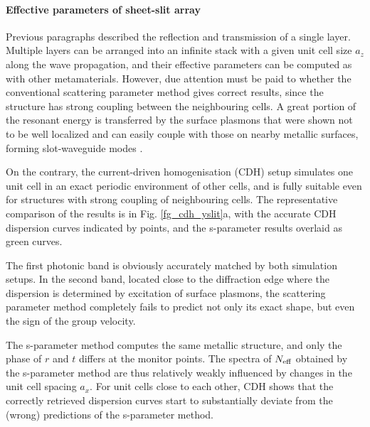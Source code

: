 \paragraph{Effective parameters of sheet-slit array}%
Previous paragraphs described the reflection and transmission of a single layer. Multiple layers can be arranged into an infinite stack with a given unit cell size $a_z$ along the wave propagation, and their effective parameters can be computed as with other metamaterials. However, due attention must be paid to whether the conventional scattering parameter method gives correct results, since the structure has strong coupling between the neighbouring cells. A great portion of the resonant energy is transferred by the surface plasmons that were shown not to be well localized and can easily couple with those on nearby metallic surfaces, forming slot-waveguide modes \cite{weiner2011electromagnetics}.

On the contrary, the current-driven homogenisation (CDH) setup simulates one unit cell in an exact periodic environment of other cells, and is fully  suitable even for structures with strong coupling of neighbouring cells. The representative comparison of the results is in Fig. \ref{fg_cdh_yslit}a, with the accurate CDH dispersion curves indicated by points, and the s-parameter results overlaid as green curves. 

The first photonic band is obviously accurately matched by both simulation setups. In the second band, located close to the diffraction edge where the dispersion is determined by excitation of surface plasmons, the scattering parameter method completely fails to predict not only its exact shape, but even the sign of the group velocity. 


The s-parameter method computes the same metallic structure, and only the phase of $r$ and $t$ differs at the monitor points. The spectra of $N_{\text{eff} }$ obtained by the s-parameter method are thus relatively weakly influenced by changes in the unit cell spacing $a_x$. For unit cells close to each other, CDH shows that the correctly retrieved dispersion curves start to substantially deviate from the (wrong) predictions of the s-parameter method.

